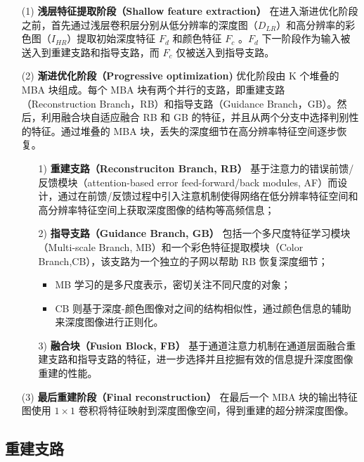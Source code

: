 \documentclass{vip-theme}
\begin{document}
\begin{enumerate}
	\item[(1)] \textbf{浅层特征提取阶段（Shallow feature extraction）}
	在进入渐进优化阶段之前，首先通过浅层卷积层分别从低分辨率的深度图（$D_{LR}$）和高分辨率的彩色图（$I_{HR}$）提取初始深度特征 $F_d$ 和颜色特征 $F_c$ 。$F_d$ 下一阶段作为输入被送入到重建支路和指导支路，而 $F_c$ 仅被送入到指导支路。
	\item[(2)] \textbf{渐进优化阶段（Progressive optimization)} 优化阶段由 K 个堆叠的 MBA 块组成。每个 MBA 块有两个并行的支路，即重建支路（Reconstruction Branch，RB）和指导支路（Guidance Branch，GB）。然后，利用融合块自适应融合 RB 和 GB 的特征，并且从两个分支中选择判别性的特征。通过堆叠的 MBA 块，丢失的深度细节在高分辨率特征空间逐步恢复。
	\begin{enumerate}
		\item[1)] \textbf{重建支路（Reconstruciton Branch, RB）} 基于注意力的错误前馈/反馈模块（attention-based error feed-forward/back modules, AF）而设计，通过在前馈/反馈过程中引入注意机制使得网络在低分辨率特征空间和高分辨率特征空间上获取深度图像的结构等高频信息；

		\item[2)] \textbf{指导支路（Guidance Branch, GB）} 包括一个多尺度特征学习模块（Multi-scale Branch, MB）和一个彩色特征提取模块（Color Branch,CB），该支路为一个独立的子网以帮助 RB 恢复深度细节；
		\begin{itemize}
			\item MB 学习的是多尺度表示，密切关注不同尺度的对象；
			\item CB 则基于深度-颜色图像对之间的结构相似性，通过颜色信息的辅助来深度图像进行正则化。
		\end{itemize}

	\item[3)] \textbf{融合块（Fusion Block, FB）} 基于通道注意力机制在通道层面融合重建支路和指导支路的特征，进一步选择并且挖掘有效的信息提升深度图像重建的性能。

 
	\end{enumerate}
	\item[(3)] \textbf{最后重建阶段（Final reconstruction）} 在最后一个 MBA 块的输出特征图使用 $1\times 1$ 卷积将特征映射到深度图像空间，得到重建的超分辨深度图像。
\end{enumerate}

\subsection{重建支路}
\end{document}
